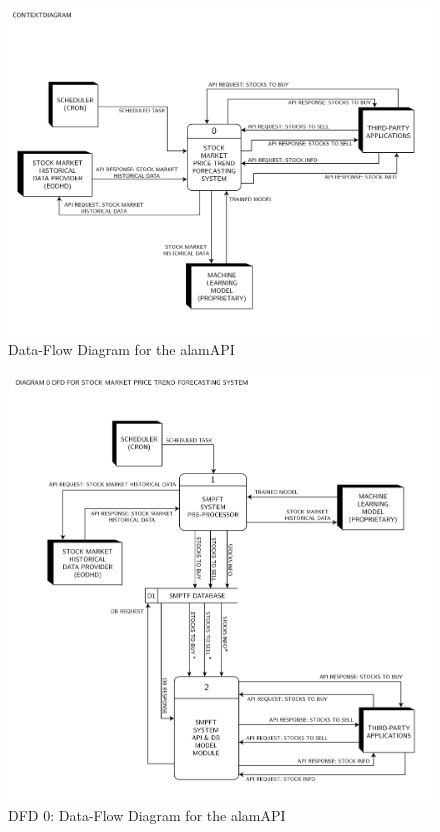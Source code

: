 
\begin{figure}
    \centering
    \includegraphics[width=1\textwidth]{./assets/Data Flow Diagram-01.png}
    \caption{Data-Flow Diagram for the alamAPI}
    \label{fig:context_dfd}
\end{figure}

\begin{figure}
    \centering
    \includegraphics[width=1\textwidth]{./assets//Data Flow Diagram-02.png}
    \caption{DFD 0: Data-Flow Diagram for the alamAPI}
    \label{fig:dfd0}
\end{figure}

